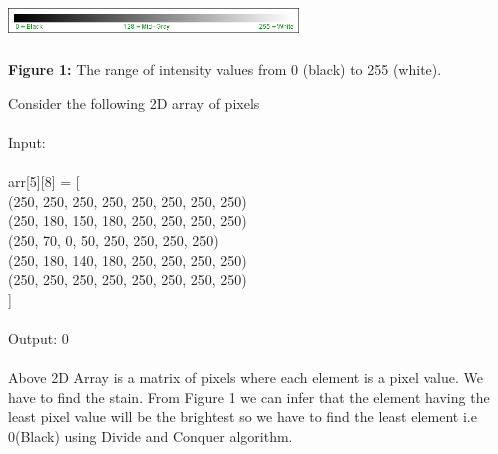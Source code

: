 \documentclass[10pt]{article}
\begin{document}
\begin{multicols*}{2}
\includegraphics[width=7.7cm, height=1.1cm]{grayrange.png}\begin{center}\textbf{Figure 1:} The range of intensity values from 0 (black) to 255 (white).\end{center}
Consider the following 2D array of pixels\\\\Input:\\\\ arr[5][8] = [\\(250, 250, 250, 250, 250, 250, 250, 250)\\(250, 180, 150, 180, 250, 250, 250, 250)\\(250, 70, 0, 50, 250, 250, 250, 250)\\(250, 180, 140, 180, 250, 250, 250, 250)\\(250, 250, 250, 250, 250, 250, 250, 250)\\]\\\\Output: 0\\\\Above 2D Array is a matrix of pixels where each element is a pixel value. We have to find the stain. From Figure 1 we can infer that the element having the least pixel value will be the brightest so we have to find the least element i.e 0(Black) using Divide and Conquer algorithm.


\end{multicols*}
\end{document}
